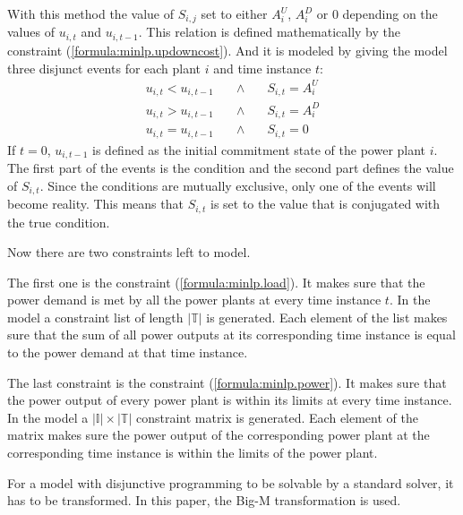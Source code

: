 With this method the value of $S_{i, j}$ set to either $A^U_i$, $A^D_i$ or $0$
depending on the values of $u_{i, t}$ and $u_{i, t-1}$.
This relation is defined mathematically by the constraint (\ref{formula:minlp.updowncost}).
And it is modeled by giving the model three disjunct events for each plant $i$ and time instance $t$:
\begin{subequations}
\begin{align}
  u_{i, t} < u_{i, t-1} \quad & \land & \quad S_{i, t} = A^U_i \\
  u_{i, t} > u_{i, t-1} \quad & \land & \quad S_{i, t} = A^D_i \\
  u_{i, t} = u_{i, t-1} \quad & \land & \quad S_{i, t} = 0
\end{align}
\end{subequations}
If $t = 0$, $u_{i, t-1}$ is defined as the initial commitment state of the power plant $i$.
The first part of the events is the condition and the second part defines the value of $S_{i, t}$.
Since the conditions are mutually exclusive,
only one of the events will become reality.
This means that $S_{i, t}$ is set to the value that is conjugated with the true condition.

Now there are two constraints left to model.

The first one is the constraint (\ref{formula:minlp.load}).
It makes sure that the power demand is met by all the power plants at every time instance $t$.
In the model a constraint list of length $|\mathbb{T}|$ is generated.
Each element of the list makes sure that the sum of all power outputs at its corresponding time instance
is equal to the power demand at that time instance.

The last constraint is the constraint (\ref{formula:minlp.power}).
It makes sure that the power output of every power plant is within its limits at every time instance.
In the model a $|\mathbb{I}| \times |\mathbb{T}|$ constraint matrix is generated.
Each element of the matrix makes sure the power output of the corresponding power plant
at the corresponding time instance is within the limits of the power plant.

For a model with disjunctive programming to be solvable by a standard solver,
it has to be transformed.
In this paper, the Big-M transformation is used.
\cite{Trespalacios2015}
